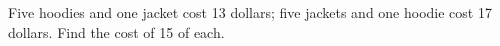 Five hoodies and one jacket cost 13 dollars; five jackets and one hoodie cost 17 dollars. Find the cost of 15 of each.
